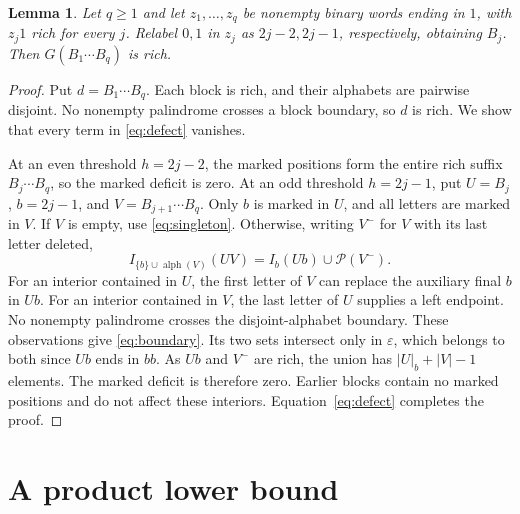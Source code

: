 \documentclass[10pt]{article}
\newtheorem{lemma}[theorem]{Lemma}
\newcommand{\Pal}{\mathcal P}
\newcommand{\Alphab}{\operatorname{alph}}
\begin{document}
\begin{lemma}\label{lem:concat}
Let $q\ge1$ and let $z_1,\ldots,z_q$ be nonempty binary words ending in $1$, with
$z_j1$ rich for every $j$. Relabel $0,1$ in $z_j$ as $2j-2,2j-1$,
respectively, obtaining $B_j$. Then $G(B_1\cdots B_q)$ is rich.
\end{lemma}
\begin{proof}
Put $d=B_1\cdots B_q$. Each block is rich, and their alphabets are
pairwise disjoint. No nonempty palindrome crosses a block boundary,
so $d$ is rich. We show that every term in \eqref{eq:defect} vanishes.

At an even threshold $h=2j-2$, the marked positions form the entire
rich suffix $B_j\cdots B_q$, so the marked deficit is zero.
At an odd threshold $h=2j-1$, put $U=B_j$, $b=2j-1$, and
$V=B_{j+1}\cdots B_q$. Only $b$ is marked in $U$, and all letters
are marked in $V$. If $V$ is empty, use \eqref{eq:singleton}.
Otherwise, writing $V^-$ for $V$ with its last letter deleted,
\begin{equation}\label{eq:boundary}
 I_{\{b\}\cup\Alphab(V)}(UV)=I_b(Ub)\cup\Pal(V^-).
\end{equation}
For an interior contained in $U$, the first letter of $V$ can replace
the auxiliary final $b$ in $Ub$. For an interior contained in $V$,
the last letter of $U$ supplies a left endpoint. No nonempty palindrome
crosses the disjoint-alphabet boundary. These observations give
\eqref{eq:boundary}. Its two sets intersect only in $\varepsilon$,
which belongs to both since $Ub$ ends in $bb$.
As $Ub$ and $V^-$ are rich, the union has
$|U|_b+|V|-1$ elements. The marked deficit is therefore zero.
Earlier blocks contain no marked positions and do not affect these
interiors. Equation~\eqref{eq:defect} completes the proof.
\end{proof}

\section{A product lower bound}
\end{document}
